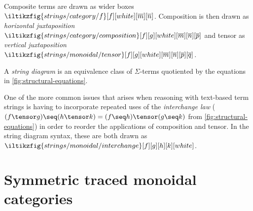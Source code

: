 Composite terms are drawn as wider boxes \(
    \iltikzfig{strings/category/f}[f][white][\overline{m}][\overline{n}]
\).
Composition is then drawn as \emph{horizontal juxtaposition} \(
    \iltikzfig{strings/category/composition}[f][g][white][\overline{m}][\overline{n}][\overline{p}]
\) and tensor as \emph{vertical juxtaposition} \(
    \iltikzfig{strings/monoidal/tensor}[f][g][white][\overline{m}][\overline{n}][\overline{p}][\overline{q}]
\).

\begin{definition}
    A \emph{string diagram} is an equivalence class of \(\Sigma\)-terms
    quotiented by the equations in \cref{fig:structural-equations}.
\end{definition}

\begin{example}
    One of the more common issues that arises when reasoning with text-based
    term strings is having to incorporate repeated uses of the
    \emph{interchange law} (\(
        (f \tensor g) \seq (h \tensor k) = (f \seq h) \tensor (g \seq k)
    \) from \cref{fig:structural-equations}) in order to reorder the
    applications of composition and tensor.
    In the string diagram syntax, these are both drawn as \(
        \iltikzfig{strings/monoidal/interchange}[f][g][h][k][white]
    \).
\end{example}


\section{Symmetric traced monoidal categories}